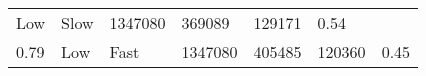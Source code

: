 \documentclass[]{article}
\begin{document}
\begin{longtable}[]{@{}lllllll@{}}
\begin{minipage}[t]{0.07\columnwidth}
Low\strut
\end{minipage} & \begin{minipage}[t]{0.07\columnwidth}\raggedright\strut
Slow\strut
\end{minipage} & \begin{minipage}[t]{0.07\columnwidth}\raggedright\strut
1347080\strut
\end{minipage} & \begin{minipage}[t]{0.07\columnwidth}\raggedright\strut
369089\strut
\end{minipage} & \begin{minipage}[t]{0.07\columnwidth}\raggedright\strut
129171\strut
\end{minipage} & \begin{minipage}[t]{0.07\columnwidth}\raggedright\strut
0.54\strut
\end{minipage}\tabularnewline
\begin{minipage}[t]{0.07\columnwidth}\raggedright\strut
0.79\strut
\end{minipage} & \begin{minipage}[t]{0.07\columnwidth}\raggedright\strut
Low\strut
\end{minipage} & \begin{minipage}[t]{0.07\columnwidth}\raggedright\strut
Fast\strut
\end{minipage} & \begin{minipage}[t]{0.07\columnwidth}\raggedright\strut
1347080\strut
\end{minipage} & \begin{minipage}[t]{0.07\columnwidth}\raggedright\strut
405485\strut
\end{minipage} & \begin{minipage}[t]{0.07\columnwidth}\raggedright\strut
120360\strut
\end{minipage} & \begin{minipage}[t]{0.07\columnwidth}\raggedright\strut
0.45\strut
\end{minipage}\tabularnewline
\bottomrule
\end{longtable}

\newpage
\end{document}
